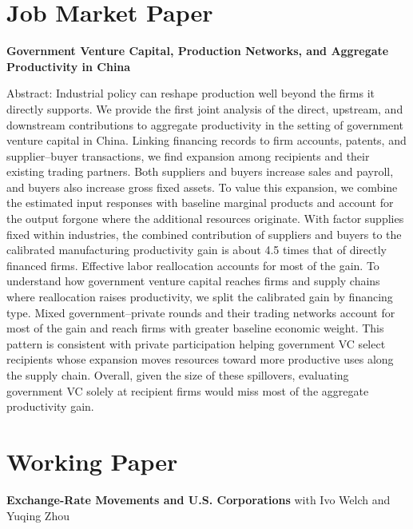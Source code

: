 \documentclass[11pt,letterpaper]{article}
\newcommand{\paper}[1]{\textbf{#1}\par\nopagebreak\vspace{2pt}\nopagebreak}
\begin{document}
\section*{Job Market Paper}
\paper{Government Venture Capital, Production Networks, and Aggregate Productivity in China}
Abstract: Industrial policy can reshape production well beyond the firms it directly supports. We provide the first joint analysis of the direct, upstream, and downstream contributions to aggregate productivity in the setting of government venture capital in China. Linking financing records to firm accounts, patents, and supplier–buyer transactions, we find expansion among recipients and their existing trading partners. Both suppliers and buyers increase sales and payroll, and buyers also increase gross fixed assets. To value this expansion, we combine the estimated input responses with baseline marginal products and account for the output forgone where the additional resources originate. With factor supplies fixed within industries, the combined contribution of suppliers and buyers to the calibrated manufacturing productivity gain is about 4.5 times that of directly financed firms. Effective labor reallocation accounts for most of the gain. To understand how government venture capital reaches firms and supply chains where reallocation raises productivity, we split the calibrated gain by financing type. Mixed government–private rounds and their trading networks account for most of the gain and reach firms with greater baseline economic weight. This pattern is consistent with private participation helping government VC select recipients whose expansion moves resources toward more productive uses along the supply chain. Overall, given the size of these spillovers, evaluating government VC solely at recipient firms would miss most of the aggregate productivity gain.
\newpage
\fontsize{10.5}{12.2}\selectfont
\titlespacing*{\section}{0pt}{4pt}{2pt}
\section*{Working Paper}
\textbf{Exchange-Rate Movements and U.S. Corporations} with Ivo Welch and Yuqing Zhou\par\nopagebreak\vspace{2pt}\nopagebreak
\end{document}
